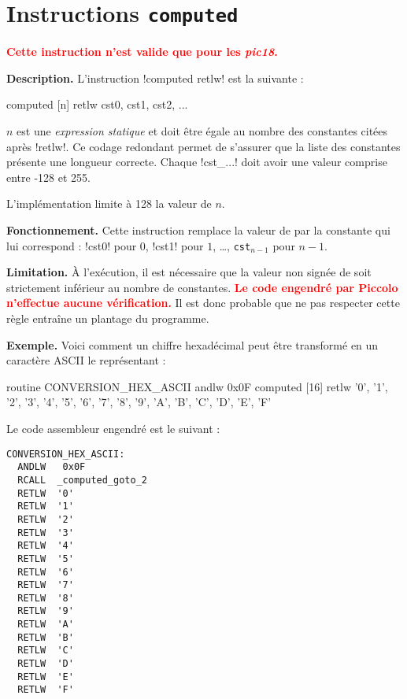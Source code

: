 \section{Instructions \texttt{computed}}


\textcolor{red}{\bf Cette instruction n'est valide que pour les \emph{pic18}.}

\textbf{Description.} L'instruction \pic!computed retlw! est la suivante :
\begin{piccolo}
computed [n] retlw cst0, cst1, cst2, ...
\end{piccolo}

$n$ est une \emph{expression statique} et doit être égale au nombre des constantes citées après \pic!retlw!. Ce codage redondant permet de s'assurer que la liste des constantes présente une longueur correcte. Chaque \pic!cst_...! doit avoir une valeur comprise entre -128 et 255.

L'implémentation limite à 128 la valeur de $n$.

\textbf{Fonctionnement.} Cette instruction remplace la valeur de  par la constante qui lui correspond : \pic!cst0! pour $0$, \pic!cst1! pour $1$, …, \texttt{cst$_{n-1}$} pour $n-1$. 

\textbf{Limitation.} À l'exécution, il est nécessaire que la valeur non signée de  soit strictement inférieur au nombre de constantes. \textcolor{red}{\bf Le code engendré par Piccolo n'effectue aucune vérification.} Il est donc probable que ne pas respecter cette règle entraîne un plantage du programme.


\textbf{Exemple.} Voici comment un chiffre hexadécimal peut être transformé en un caractère ASCII le représentant :
\begin{piccolo}
routine CONVERSION_HEX_ASCII {
  andlw   0x0F
  computed [16] retlw
   '0', '1', '2', '3', '4', '5', '6', '7',
   '8', '9', 'A', 'B', 'C', 'D', 'E', 'F'
}
\end{piccolo}

Le code assembleur engendré est le suivant :
\begin{lstlisting}[language=assembleur]
CONVERSION_HEX_ASCII:
  ANDLW   0x0F
  RCALL  _computed_goto_2
  RETLW  '0'
  RETLW  '1'
  RETLW  '2'
  RETLW  '3'
  RETLW  '4'
  RETLW  '5'
  RETLW  '6'
  RETLW  '7'
  RETLW  '8'
  RETLW  '9'
  RETLW  'A'
  RETLW  'B'
  RETLW  'C'
  RETLW  'D'
  RETLW  'E'
  RETLW  'F'
\end{lstlisting}

